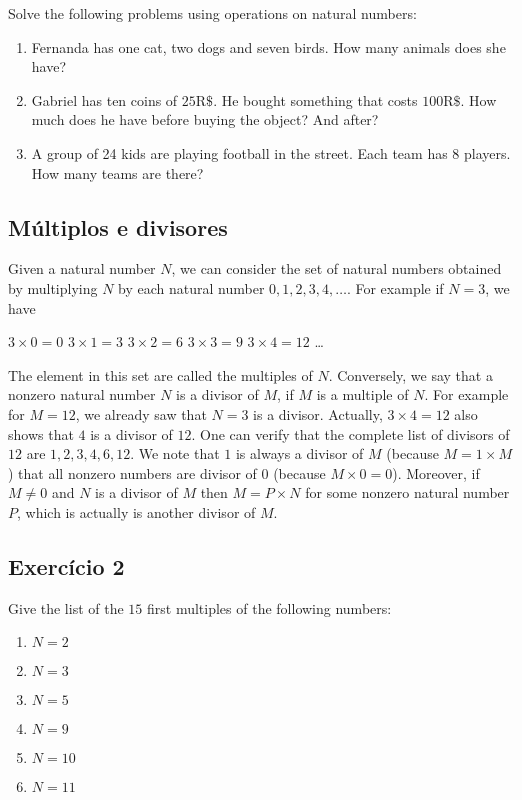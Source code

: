Solve the following problems using operations on natural numbers:

\begin{enumerate}
\item Fernanda has one cat, two dogs and seven birds. How many animals does she
  have?
\item Gabriel has ten coins of $25\text{R\$}$. He bought something that costs
  $100\text{R\$}$. How much does he have before buying the object?
  And after?
\item A group of 24 kids are playing football in the street. Each team
  has 8 players. How many teams are there?
\end{enumerate}

\subsection*{Múltiplos e divisores}

Given a natural number $N$, we can consider the set of natural numbers obtained
by multiplying $N$ by each natural number $0, 1, 2, 3, 4, \ldots$. For example
if $N = 3$, we have

$3 \times 0 = 0$
$3 \times 1 = 3$
$3 \times 2 = 6$
$3 \times 3 = 9$
$3 \times 4 = 12$
\ldots

The element in this set are called the multiples of $N$. Conversely, we say
that a nonzero natural number $N$ is a divisor of $M$, if $M$ is a multiple
of $N$. For example for
$M=12$, we already saw that $N=3$ is a divisor. Actually, $3 \times 4 = 12$
also shows that $4$ is a divisor of $12$. One can verify that the complete
list of divisors of $12$ are $1,2,3,4,6,12$.
We note that $1$ is always a divisor
of $M$ (because $M = 1 \times M$) that all nonzero numbers are divisor of $0$
(because $M \times 0 = 0$). Moreover, if $M \neq 0$ and $N$ is a divisor of
$M$ then $M = P \times N$ for some nonzero natural number $P$, which is
actually is another divisor of $M$.

\subsection*{Exercício 2}

Give the list of the $15$ first multiples of the following numbers:

\begin{enumerate}
\item $N=2$
\item $N=3$
\item $N=5$
\item $N=9$
\item $N=10$
\item $N=11$
\end{enumerate}


